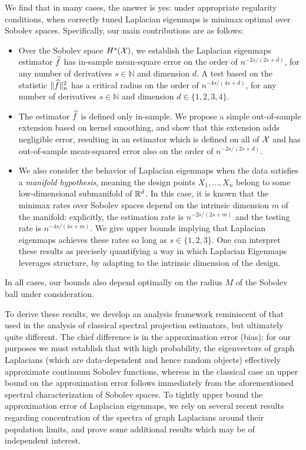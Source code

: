 We find that in many cases, the answer is yes: under appropriate regularity conditions, when correctly tuned Laplacian eigenmaps is minimax optimal over Sobolev spaces. Specifically, our main contributions are as follows:
\begin{itemize}
	\item Over the Sobolev space $H^{s}(\mathcal{X})$, we establish the Laplacian eigenmaps estimator $\widehat{f}$ has in-sample mean-square error on the order of $n^{-2s/(2s + d)}$, for any number of derivatives $s \in \mathbb{N}$ and dimension $d$. A test based on the statistic $\|\widehat{f}\|_n^2$ has a critical radius on the order of $n^{-4s/(4s + d)}$, for any number of derivatives $s \in \mathbb{N}$ and dimension $d \in \{1,2,3,4\}$. 
	\item The estimator $\widehat{f}$ is defined only in-sample. We propose a simple out-of-sample extension based on kernel smoothing, and show that this extension adds negligible error, resulting in an estimator which is defined on all of $\mathcal{X}$ and has out-of-sample mean-squared error also on the order of $n^{-2s/(2s + d)}$.
	\item We also consider the behavior of Laplacian eigenmaps when the data satisfies a \emph{manifold hypothesis}, meaning the design points $X_1,\ldots,X_n$ belong to some low-dimensional submanifold of $\mathbb{R}^d$. In this case, it is known that the minimax rates over Sobolev spaces depend on the intrinsic dimension $m$ of the manifold: explicitly, the estimation rate is $n^{-2s/(2s + m)}$ and the testing rate is $n^{-4s/(4s + m)}$. We give upper bounds implying that Laplacian eigenmaps achieves these rates so long as $s \in \{1,2,3\}$. One can interpret these results as precisely quantifying a way in which Laplacian Eigenmaps leverages structure, by adapting to the intrinsic dimension of the design.
\end{itemize}
In all cases, our bounds also depend optimally on the radius $M$ of the Sobolev ball under consideration.

To derive these results, we develop an analysis framework reminiscent of that used in the analysis of classical spectral projection estimators, but ultimately quite different. The chief difference is in the approximation error (bias): for our purposes we must establish that with high probability, the eigenvectors of graph Laplacians (which are data-dependent and hence random objects) effectively approximate continuum Sobolev functions, whereas in the classical case an upper bound on the approximation error follows immediately from the aforementioned spectral characterization of Sobolev spaces. To tightly upper bound the approximation error of Laplacian eigenmaps, we rely on several recent results regarding concentration of the spectra of graph Laplacians around their population limits, and prove some additional results which may be of independent interest. 

